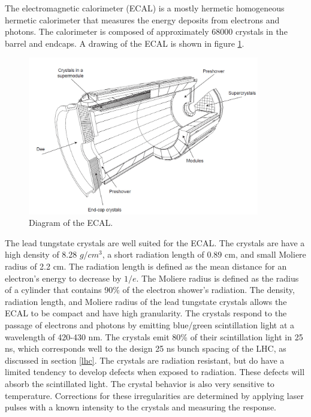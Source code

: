 \documentclass[oneside, letterpaper, oldfontcommands]{memoir}
\begin{document}
\qquad The electromagnetic calorimeter (ECAL) is a mostly hermetic homogeneous hermetic calorimeter that measures the energy deposits from electrons and photons. The calorimeter is composed of approximately 68000 crystals in the barrel and endcaps. A drawing of the ECAL is shown in figure \ref{fig:cmsecal}.

\begin{figure}[here]
\includegraphics[width=0.9\textwidth]{cmsecal.png}
\caption{Diagram of the ECAL\cite{1748-0221-3-08-S08001}.}
\label{fig:cmsecal}
\end{figure}

\qquad The lead tungstate crystals are well suited for the ECAL. The crystals are have a high density of 8.28 $g/cm^{3}$, a short radiation length of 0.89 cm, and small Moliere radius of 2.2 cm. The radiation length is defined as the mean distance for an electron's energy to decrease by $1/e$. The Moliere radius is defined as the radius of a cylinder that contains 90\% of the electron shower's radiation. The density, radiation length, and Moliere radius of the lead tungstate crystals allows the ECAL to be compact and have high granularity. The crystals respond to the passage of electrons and photons by emitting blue/green scintillation light at a wavelength of 420-430 nm. The crystals emit 80\% of their scintillation light in 25 ns, which corresponds well to the design 25 ns bunch spacing of the LHC, as discussed in section \ref{lhc}. The crystals are radiation resistant, but do have a limited tendency to develop defects when exposed to radiation. These defects will absorb the scintillated light. The crystal behavior is also very sensitive to temperature. Corrections for these irregularities are determined by applying laser pulses with a known intensity to the crystals and measuring the response.
\end{document}
